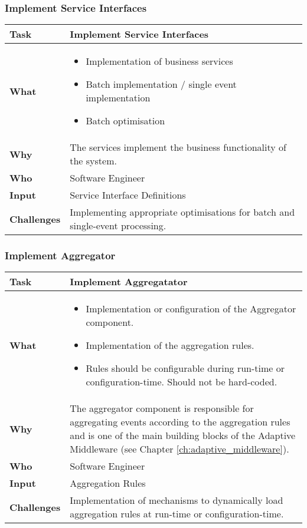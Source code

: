 \subsubsection{Implement Service Interfaces}

\begin{tabularx}{\textwidth}{@{} l X @{}}
	\caption{Implement Service Interfaces} \label{table:ch6_Task_Implement_Service_Interfaces}\\
	\toprule 
	\bfseries Task & Implement Service Interfaces\\
	\midrule 
	\bfseries What & 
	\begin{itemize}
		\item Implementation of business services
		\item Batch implementation / single event implementation
		\item Batch optimisation
	\end{itemize}
	\\
	\midrule 
	\bfseries Why & The services implement the business functionality of the system.\\
	\midrule 
	\bfseries Who & Software Engineer\\
	\midrule 
	\bfseries Input & Service Interface Definitions\\
	\midrule 
	\bfseries Challenges & Implementing appropriate optimisations for batch and single-event processing.
	\\
	\bottomrule 
\end{tabularx}


\subsubsection{Implement Aggregator}
\begin{tabularx}{\textwidth}{@{} l X @{}}
	\caption{Implement Aggregator} \label{table:ch6_Task_Implement_Aggregator}\\
	\toprule 
	\bfseries Task & Implement Aggregatator\\
	\midrule 
	\bfseries What & 
	\begin{itemize}
		\item Implementation or configuration of the Aggregator component.
		\item Implementation of the aggregation rules.
		\item Rules should be configurable during run-time or configuration-time. Should not be hard-coded.
	\end{itemize}
	\\
	\midrule 
	\bfseries Why & The aggregator component is responsible for aggregating events according to the aggregation rules and is one of the main building blocks of the Adaptive Middleware (see Chapter \ref{ch:adaptive_middleware}).\\
	\midrule 
	\bfseries Who & Software Engineer\\
	\midrule 
	\bfseries Input & Aggregation Rules\\
	\midrule 
	\bfseries Challenges & Implementation of mechanisms to dynamically load aggregation rules at run-time or configuration-time.\\
	\bottomrule 
\end{tabularx}

